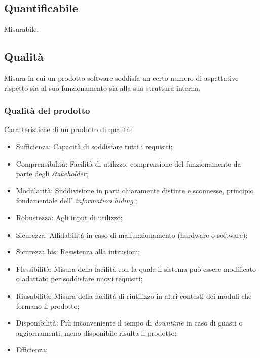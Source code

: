 
	\subsection{Quantificabile}
	\label{sec:quantificabile}
	Misurabile.
	
	\subsection{Qualità} 
	\label{sec:qualita}
	 Misura in cui un prodotto software soddisfa un certo numero di aspettative rispetto sia al suo funzionamento sia alla sua struttura interna.
	\subsubsection{Qualità del prodotto}
	\label{sec:qualitaprodotto}
	Caratteristiche di un prodotto di qualità:
	\begin{itemize}  
	\item Sufficienza: Capacità di soddisfare tutti i requisiti;
	\item Comprensibilità: Facilità di utilizzo, comprensione del funzionamento da parte degli  \emph{stakeholder};
	\item Modularità: Suddivisione in parti chiaramente distinte e sconnesse, principio fondamentale dell' \emph{information hiding}.;
	\item Robustezza: Agli input di utilizzo;
	\item Sicurezza: Affidabilità in caso di malfunzionamento (hardware o software);
	\item Sicurezza bis: Resistenza alla intrusioni;
	\item Flessibilità: Misura della facilità con la quale il sistema può essere modificato o adattato per soddisfare nuovi requisiti;
	\item Riusabilità: Misura della facilità di riutilizzo in altri contesti dei moduli che formano il prodotto;
	\item Disponibilità: Più inconveniente il tempo di \emph{downtime} in caso di guasti o aggiornamenti, meno disponibile risulta il prodotto;	
	\item \underline{\hyperref[sec:efficienza]{Efficienza}};
	\end{itemize}
